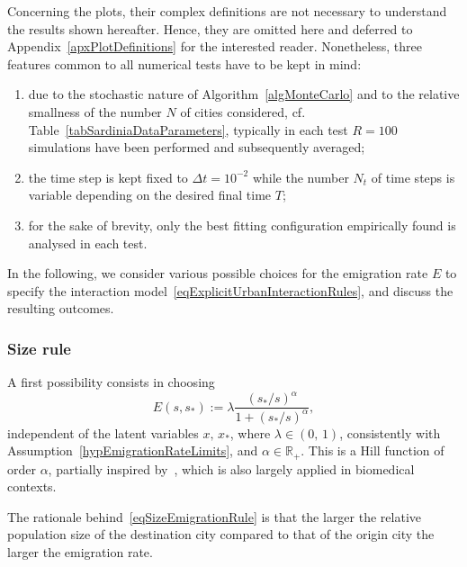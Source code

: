 \documentclass[a4paper]{article}
\newcommand{\R}{\mathbb{R}}
\begin{document}
Concerning the plots, their complex definitions are not necessary to understand the results shown hereafter. Hence, they are omitted here and deferred to Appendix~\ref{apxPlotDefinitions} for the interested reader. Nonetheless, three features common to all numerical tests have to be kept in mind:
\begin{enumerate}[label=(\roman*)]
\item due to the stochastic nature of Algorithm~\ref{algMonteCarlo} and to the relative smallness of the number $N$ of cities considered, cf. Table~\ref{tabSardiniaDataParameters}, typically in each test $R=100$ simulations have been performed and subsequently averaged;
\item the time step is kept fixed to $\Delta t=10^{-2}$ while the number $N_t$ of time steps is variable depending on the desired final time $T$;
\item for the sake of brevity, only the best fitting configuration empirically found is analysed in each test.
\end{enumerate}

In the following, we consider various possible choices for the emigration rate $E$ to specify the interaction model~\eqref{eqExplicitUrbanInteractionRules}, and discuss the resulting outcomes.

\subsubsection{Size rule}
\label{secSER}
%
A first possibility consists in choosing
\begin{equation}
    E(s,s_\ast):=\lambda\frac{\left(s_\ast/s\right)^\alpha}{1+\left(s_\ast/s\right)^\alpha},
    \label{eqSizeEmigrationRule}
\end{equation}
independent of the latent variables $x,\,x_\ast$, where $\lambda\in (0,\,1)$, consistently with Assumption~\ref{hypEmigrationRateLimits}, and $\alpha\in\R_+$. This is a Hill function of order $\alpha$, partially inspired by~\cite{Gualandi2019SDC}, which is also largely applied in biomedical contexts.

The rationale behind~\eqref{eqSizeEmigrationRule} is that the larger the relative population size of the destination city compared to that of the origin city the larger the emigration rate.
\end{document}
